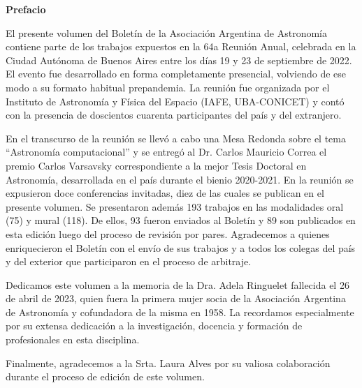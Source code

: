 \documentclass[11pt]{article}
\begin{document}
\begin{center}
{\bf Prefacio}
\end{center}


El presente volumen del Bolet\'in de la Asociaci\'on Argentina de Astronom\'ia contiene parte de los trabajos expuestos en la 64a Reuni\'on Anual, celebrada en la Ciudad Aut\'onoma de Buenos Aires entre los d\'ias 19 y 23 de septiembre de 2022. El evento fue desarrollado en forma completamente presencial, volviendo de ese modo a su formato habitual prepandemia. La reuni\'on fue organizada por el Instituto de Astronom\'ia y F\'isica del Espacio (IAFE, UBA-CONICET) y cont\'o con la presencia de doscientos cuarenta participantes del pa\'is y del extranjero.

En el transcurso de la reuni\'on se llev\'o a cabo una Mesa Redonda sobre el tema ``Astronom\'ia computacional'' y se entreg\'o al Dr. Carlos Mauricio Correa el premio Carlos Varsavsky correspondiente a la mejor Tesis Doctoral en Astronom\'ia, desarrollada en el pa\'is durante el bienio 2020-2021.
En la reuni\'on se expusieron doce conferencias invitadas, diez de las cuales se publican en el presente volumen. Se presentaron adem\'as 193 trabajos en las modalidades oral (75) y mural (118). De ellos, 93 fueron enviados al Bolet\'in y 89 son publicados en esta edici\'on luego del proceso de revisi\'on por pares. Agradecemos a quienes enriquecieron el Bolet\'in con el env\'io de sus trabajos y a todos los colegas del pa\'is y del exterior que participaron en el proceso de arbitraje.

Dedicamos este volumen a la memoria de la Dra. Adela Ringuelet fallecida el 26 de abril de 2023, quien fuera la primera mujer socia de la Asociaci\'on Argentina de Astronom\'ia y cofundadora de la misma en 1958. La recordamos especialmente por su extensa dedicaci\'on a la investigaci\'on, docencia y formaci\'on de profesionales en esta disciplina.

Finalmente, agradecemos a la Srta. Laura Alves por su valiosa colaboraci\'on durante el proceso de edici\'on de este volumen.
\end{document}
